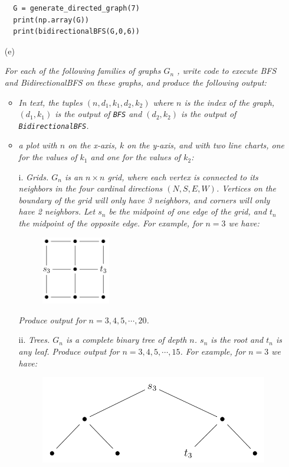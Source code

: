 \documentclass[12pt]{article} \setlength{\oddsidemargin}{0in}
\begin{document}
\begin{enumerate}
\begin{verbatim}
  G = generate_directed_graph(7)
  print(np.array(G))
  print(bidirectionalBFS(G,0,6))
  \end{verbatim}
  \newpage
\item[(e)]{\textit{For each of the following families of graphs $G_n$ , write code to execute BFS and BidirectionalBFS on these graphs, and produce the following output:}
    \begin{itemize}
    \item \textit{In text, the tuples $(n, d_1, k_1, d_2, k_2)$ where $n$ is the index of the graph, $(d_1, k_1)$ is the output of \texttt{BFS} and $(d_2, k_2)$ is the output of \texttt{BidirectionalBFS}.}
    \item \textit{a plot with $n$ on the x-axis, $k$ on the y-axis, and with two line charts, one for the values of $k_1$ and one for the values of $k_2$:}
    \end{itemize}
    \begin{enumerate}
    \item[i.] \textit{Grids. $G_n$ is an $n \times n$ grid, where each vertex is connected to its neighbors in the four cardinal directions $(N,S,E,W)$. Vertices on the boundary of the grid
will only have 3 neighbors, and corners will only have 2 neighbors. Let $s_n$
be the midpoint of one edge of the grid, and $t_n$ the midpoint of the opposite
edge. For example, for $n = 3$ we have:}

\begin{figure}[h]
  \centering \includegraphics[width=0.3\textwidth]{P41}
\end{figure}

\textit{Produce output for $n = 3, 4, 5, \cdots, 20$.}

\item[ii.] \textit{Trees. $G_n$ is a complete binary tree of depth $n$. $s_n$ is the root and $t_n$ is any leaf. Produce output for $n = 3, 4, 5, \cdots, 15$. For example, for $n = 3$ we have:}

  \begin{figure}[H]
  \centering \includegraphics[width=1\textwidth]{P42}
  \end{figure}


\end{enumerate}}
\end{enumerate}
\end{document}
